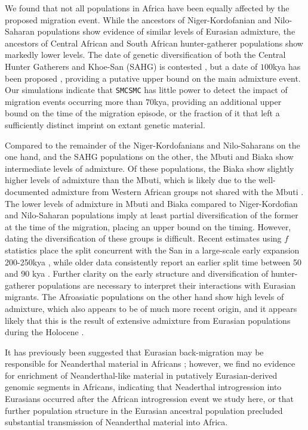 We found that not all populations in Africa have been equally affected by the proposed migration event. While the ancestors of Niger-Kordofanian and Nilo-Saharan populations show evidence of similar levels of Eurasian admixture, the ancestors of Central African and South African hunter-gatherer populations show markedly lower levels.  The date of genetic diversification of both the Central Hunter Gatherers and Khoe-San (SAHG) is contested \cite{Lipson2019}, but a date of $100$kya has been proposed \cite{Schlebusch2012}, providing a putative upper bound on the main admixture event.  Our simulations indicate that {\tt SMCSMC} has little power to detect the impact of migration events occurring more than $70$kya, providing an additional upper bound on the time of the migration episode, or the fraction of it that left a sufficiently distinct imprint on extant genetic material.

Compared to the remainder of the Niger-Kordofanians and Nilo-Saharans on the one hand, and the SAHG populations on the other, the Mbuti and Biaka show intermediate levels of admixture. Of these populations, the Biaka show slightly higher levels of admixture than the Mbuti, which is likely due to the well-documented admixture from Western African groups not shared with the Mbuti \cite{Batini2011}. The lower levels of admixture in Mbuti and Biaka compared to Niger-Kordofian and Nilo-Saharan populations imply at least partial diversification of the former at the time of the migration, placing an upper bound on the timing. However, dating the diversification of these groups is difficult. Recent estimates using $f$ statistics place the split concurrent with the San in a large-scale early expansion 200-250kya \cite{Lipson2019}, while older data consistently report an earlier split time between 50 and 90 kya \cite{Patin2018}. Further clarity on the early structure and diversification of hunter-gatherer populations are necessary to interpret their interactions with Eurasian migrants. The  Afroasiatic populations on the other hand show high levels of admixture, which also appears to be of much more recent origin, and it appears likely that this is the result of extensive admixture from Eurasian populations during the Holocene \cite{Busby2016, Fan2019}. 

It has previously been suggested that Eurasian back-migration may be responsible for Neanderthal material in Africans \cite{Chen2020}; however, we find no evidence for enrichment of Neanderthal-like material in putatively Eurasian-derived genomic segments in Africans, indicating that Neaderthal introgression into Eurasians occurred after the African introgression event we study here, or that further population structure in the Eurasian ancestral population precluded substantial transmission of Neanderthal material into Africa.

